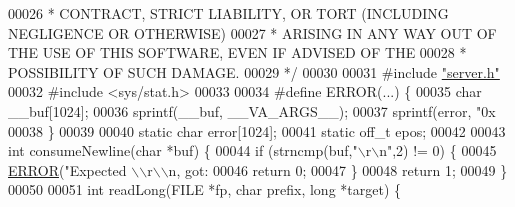 \begin{DoxyCode}
00026 \textcolor{comment}{ * CONTRACT, STRICT LIABILITY, OR TORT (INCLUDING NEGLIGENCE OR OTHERWISE)}
00027 \textcolor{comment}{ * ARISING IN ANY WAY OUT OF THE USE OF THIS SOFTWARE, EVEN IF ADVISED OF THE}
00028 \textcolor{comment}{ * POSSIBILITY OF SUCH DAMAGE.}
00029 \textcolor{comment}{ */}
00030 
00031 \textcolor{preprocessor}{#}\textcolor{preprocessor}{include} \hyperlink{server_8h}{"server.h"}
00032 \textcolor{preprocessor}{#}\textcolor{preprocessor}{include} \textcolor{preprocessor}{<}\textcolor{preprocessor}{sys}\textcolor{preprocessor}{/}\textcolor{preprocessor}{stat}\textcolor{preprocessor}{.}\textcolor{preprocessor}{h}\textcolor{preprocessor}{>}
00033 
00034 \textcolor{preprocessor}{#}\textcolor{preprocessor}{define} \textcolor{preprocessor}{ERROR}\textcolor{preprocessor}{(}\textcolor{preprocessor}{...}\textcolor{preprocessor}{)} \textcolor{preprocessor}{\{}
00035     \textcolor{keywordtype}{char} \textcolor{preprocessor}{\_\_buf}\textcolor{preprocessor}{[}1024\textcolor{preprocessor}{]}\textcolor{preprocessor}{;}
00036     \textcolor{preprocessor}{sprintf}\textcolor{preprocessor}{(}\textcolor{preprocessor}{\_\_buf}\textcolor{preprocessor}{,} \textcolor{preprocessor}{\_\_VA\_ARGS\_\_}\textcolor{preprocessor}{)}\textcolor{preprocessor}{;}
00037     \textcolor{preprocessor}{sprintf}\textcolor{preprocessor}{(}\textcolor{preprocessor}{error}\textcolor{preprocessor}{,} \textcolor{stringliteral}{"0x%
00038 \textcolor{preprocessor}{\}}
00039 
00040 \textcolor{keyword}{static} \textcolor{keywordtype}{char} error[1024];
00041 \textcolor{keyword}{static} off\_t epos;
00042 
00043 \textcolor{keywordtype}{int} consumeNewline(\textcolor{keywordtype}{char} *buf) \{
00044     \textcolor{keywordflow}{if} (strncmp(buf,\textcolor{stringliteral}{"\(\backslash\)r\(\backslash\)n"},2) != 0) \{
00045         \hyperlink{redis-check-aof_8c_a02ce8a968600d004ba60858425c46307}{ERROR}(\textcolor{stringliteral}{"Expected \(\backslash\)\(\backslash\)r\(\backslash\)\(\backslash\)n, got: %
00046         \textcolor{keywordflow}{return} 0;
00047     \}
00048     \textcolor{keywordflow}{return} 1;
00049 \}
00050 
00051 \textcolor{keywordtype}{int} readLong(FILE *fp, \textcolor{keywordtype}{char} prefix, \textcolor{keywordtype}{long} *target) \{
}}
\end{DoxyCode}
